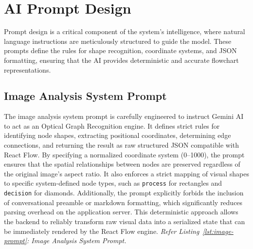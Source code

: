 
\section{AI Prompt Design}
\label{sec:prompt-design}

\justifying
Prompt design is a critical component of the system's intelligence, where natural language instructions are meticulously structured to guide the model. These prompts define the rules for shape recognition, coordinate systems, and JSON formatting, ensuring that the AI provides deterministic and accurate flowchart representations.

\subsection{Image Analysis System Prompt}

\justifying
The image analysis system prompt is carefully engineered to instruct Gemini AI to act as an Optical Graph Recognition engine. It defines strict rules for identifying node shapes, extracting positional coordinates, determining edge connections, and returning the result as raw structured JSON compatible with React Flow. By specifying a normalized coordinate system (0--1000), the prompt ensures that the spatial relationships between nodes are preserved regardless of the original image's aspect ratio. It also enforces a strict mapping of visual shapes to specific system-defined node types, such as \texttt{process} for rectangles and \texttt{decision} for diamonds. Additionally, the prompt explicitly forbids the inclusion of conversational preamble or markdown formatting, which significantly reduces parsing overhead on the application server. This deterministic approach allows the backend to reliably transform raw visual data into a serialized state that can be immediately rendered by the React Flow engine. \textit{Refer Listing~\ref{lst:image-prompt}: Image Analysis System Prompt.}

